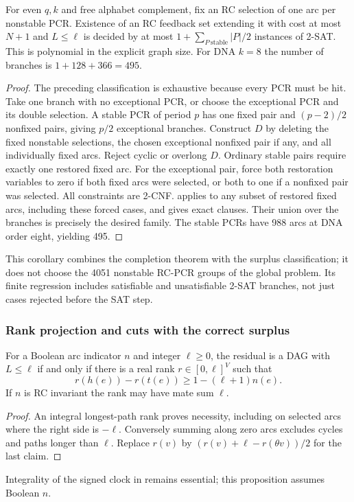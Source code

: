 \begin{corollary}
\label{cor:excess-one-oracle}
For even $q,k$ and free alphabet complement, fix an RC selection
of one arc per nonstable PCR. Existence of an RC feedback set
extending it with cost at most $N+1$ and $L\le\ell$ is decided
by at most $1+\sum_{P\ \mathrm{stable}}|P|/2$ instances of 2-SAT.
This is polynomial in the explicit graph size. For DNA $k=8$
the number of branches is $1+128+366=495$.
\end{corollary}
\begin{proof}
The preceding classification is exhaustive because every PCR
must be hit. Take one branch with no exceptional PCR, or choose
the exceptional PCR and its double selection. A stable PCR of
period $p$ has one fixed pair and $(p-2)/2$ nonfixed pairs, giving
$p/2$ exceptional branches. Construct $D$ by deleting the fixed
nonstable selections, the chosen exceptional nonfixed pair if any,
and all individually fixed arcs. Reject cyclic or overlong $D$.
Ordinary stable pairs require exactly one restored fixed arc.
For the exceptional pair, force both restoration variables to zero
if both fixed arcs were selected, or both to one if a nonfixed
pair was selected. All constraints are 2-CNF.
 applies to any subset of restored
fixed arcs, including these forced cases, and gives exact clauses.
Their union over the branches is precisely the desired family.
The stable PCRs have 988 arcs at DNA order eight, yielding 495.
\end{proof}
This corollary combines the completion theorem with the surplus
classification; it does not choose the 4051 nonstable RC-PCR
groups of the global problem. Its finite regression includes
satisfiable and unsatisfiable 2-SAT branches, not just cases
rejected before the SAT step.

\subsubsection{Rank projection and cuts with the correct surplus}
\begin{proposition}
\label{prop:boolean-ranks}
For a Boolean arc indicator $n$ and integer $\ell\ge0$, the residual
is a DAG with $L\le\ell$ if and only if there is a real rank
$r\in[0,\ell]^V$ such that
\[
 r(h(e))-r(t(e))\ge1-(\ell+1)n(e).
\]
If $n$ is RC invariant the rank may have mate sum $\ell$.
\end{proposition}
\begin{proof}
An integral longest-path rank proves necessity, including on
selected arcs where the right side is $-\ell$. Conversely summing
along zero arcs excludes cycles and paths longer than $\ell$.
Replace $r(v)$ by $(r(v)+\ell-r(\theta v))/2$ for the last claim.
\end{proof}
Integrality of the signed clock in  remains
essential; this proposition assumes Boolean $n$.

